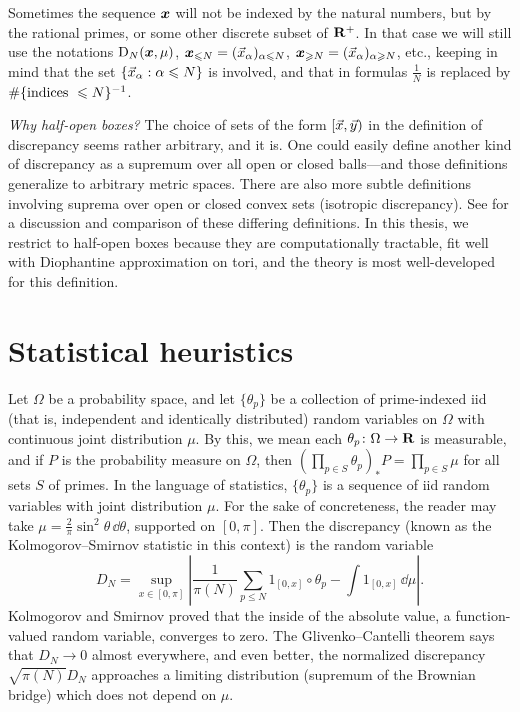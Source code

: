 Sometimes the sequence ${\boldsymbol x}$ will not be indexed by the natural numbers, but 
by the rational primes, or some other discrete subset of $\mathbf{R}^+$. In that case 
we will still use the notations $\operatorname{D}_N({\boldsymbol x},\mu)$, 
${\boldsymbol x}_{\leqslant N} = (\vec{x}_\alpha)_{\alpha\leqslant N}$, 
${\boldsymbol x}_{\geqslant N} = (\vec{x}_\alpha)_{\alpha\geqslant N}$, etc., 
keeping in mind that the set $\{\vec{x}_\alpha : \alpha \leqslant N\}$ is involved, 
and that in formulas $\frac{1}{N}$ is replaced by 
$\#\{\textnormal{indices }\leqslant N\}^{-1}$. 

\emph{Why half-open boxes?} The choice of sets of the form $[\vec{x},\vec{y})$ in the 
definition of discrepancy seems rather arbitrary, and it is. One could easily 
define another kind of discrepancy as a supremum over all open or closed 
balls---and 
those  definitions generalize to arbitrary metric spaces. There are also more 
subtle definitions involving suprema over open or closed convex sets 
(isotropic discrepancy). See \cite{kuipers-niederreiter-1974} for a discussion 
and comparison of these differing definitions. In this thesis, we restrict to 
half-open boxes because they are computationally tractable, fit well with 
Diophantine approximation on tori, and the theory is most well-developed for 
this definition. 





\section{Statistical heuristics}

Let $\Omega$ be a probability space, and let $\{\theta_p\}$ be a collection of 
prime-indexed iid (that is, independent and identically distributed) 
random variables on 
$\Omega$ with continuous joint distribution $\mu$. By this, we mean each 
$\theta_p\colon \Omega \to \mathbf{R}$ is measurable, and if $P$ is the probability 
measure on $\Omega$, then 
$\left(\prod_{p\in S} \theta_p\right)_\ast P = \prod_{p\in S} \mu$ for all 
sets $S$ of primes. In 
the language of statistics, $\{\theta_p\}$ is a sequence of iid random 
variables with joint distribution $\mu$. For the sake of concreteness, the 
reader may take $\mu = \frac{2}{\pi} \sin^2 \theta\, \dd\theta$, 
supported on $[0,\pi]$. Then the discrepancy (known as the 
Kolmogorov--Smirnov statistic in this context) is the random variable 
\[
	D_N = \sup_{x\in [0,\pi]} \left|\frac{1}{\pi(N)} \sum_{p\leqslant N} 1_{[0,x]}\circ \theta_p - \int 1_{[0,x]}\, \dd\mu\right| .
\]
Kolmogorov and Smirnov proved that the inside of the absolute value, a 
function-valued random variable, converges 
to zero. The Glivenko--Cantelli theorem says that $D_N \to 0$ almost everywhere, 
and even better, the normalized discrepancy $\sqrt{\pi(N)} D_N$ approaches 
a limiting distribution (supremum of the Brownian bridge) which does not 
depend on $\mu$. 

